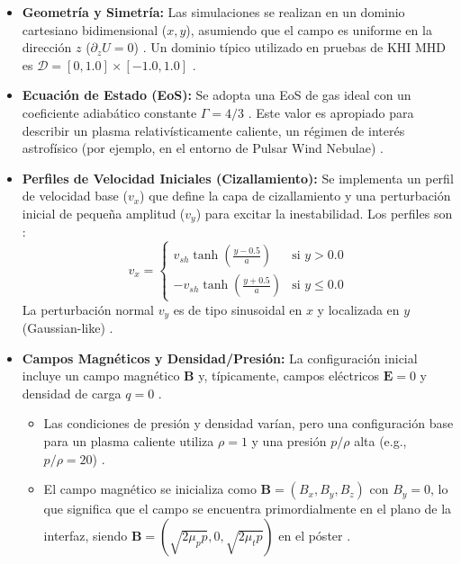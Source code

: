 \begin{itemize}
    \item \textbf{Geometría y Simetría:} Las simulaciones se realizan en un dominio cartesiano bidimensional ($x, y$), asumiendo que el campo es uniforme en la dirección $z$ ($\partial_z U = 0$) \cite{330, 394}. Un dominio típico utilizado en pruebas de KHI MHD es $\mathcal{D} = [0, 1.0] \times [-1.0, 1.0]$ \cite{347}.
    \item \textbf{Ecuación de Estado (EoS):} Se adopta una EoS de gas ideal con un coeficiente adiabático constante $\Gamma = 4/3$ \cite{392}. Este valor es apropiado para describir un plasma relativísticamente caliente, un régimen de interés astrofísico (por ejemplo, en el entorno de Pulsar Wind Nebulae) \cite{331, 378, 451}.
    \item \textbf{Perfiles de Velocidad Iniciales (Cizallamiento):} Se implementa un perfil de velocidad base ($v_x$) que define la capa de cizallamiento y una perturbación inicial de pequeña amplitud ($v_y$) para excitar la inestabilidad. Los perfiles son \cite{392}:
    \begin{equation*}
    v_x = \begin{cases} v_{sh} \tanh \left( \frac{y - 0.5}{a} \right) & \text{si } y > 0.0 \\ -v_{sh} \tanh \left( \frac{y + 0.5}{a} \right) & \text{si } y \leq 0.0 \end{cases}
    \end{equation*}
    La perturbación normal $v_y$ es de tipo sinusoidal en $x$ y localizada en $y$ (Gaussian-like) \cite{347, 392}.
    \item \textbf{Campos Magnéticos y Densidad/Presión:} La configuración inicial incluye un campo magnético $\mathbf{B}$ y, típicamente, campos eléctricos $\mathbf{E}=0$ y densidad de carga $q=0$ \cite{381, 392}.
    \begin{itemize}
        \item Las condiciones de presión y densidad varían, pero una configuración base para un plasma caliente utiliza $\rho=1$ y una presión $p/\rho$ alta (e.g., $p/\rho=20$) \cite{451}.
        \item El campo magnético se inicializa como $\mathbf{B} = (B_x, B_y, B_z)$ con $B_y=0$, lo que significa que el campo se encuentra primordialmente en el plano de la interfaz, siendo $\mathbf{B} = (\sqrt{2\mu_p p}, 0, \sqrt{2\mu_t p})$ en el póster \cite{392}.
    \end{itemize}
\end{itemize}

